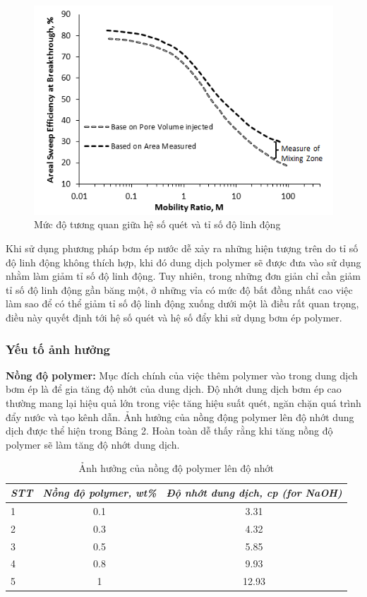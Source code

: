 \documentclass[12pt,a4paper]{article}
\begin{document}
		\begin{figure}[h]
			\centering
			\includegraphics[scale=1]{Fig/M.PNG}
			\caption{Mức độ tương quan giữa hệ số quét và tỉ số độ linh động \cite{kantzas2012fundamentals}}
		\end{figure}
	\newline
	Khi sử dụng phương pháp bơm ép nước dễ xảy ra những hiện tượng trên do tỉ số độ linh động không thích hợp, khi đó dung dịch polymer sẽ được đưa vào sử dụng nhằm làm giảm tỉ số độ linh động. Tuy nhiên, trong những đơn giản chỉ cần giảm tỉ số độ linh động gần băng một, ở những vỉa có mức độ bất đồng nhất cao việc làm sao để có thể giảm tỉ số độ linh động xuống dưới một là điều rất quan trọng, điều này quyết định tới hệ số quét và hệ số đẩy khi sử dụng bơm ép polymer. 

	\subsubsection{Yếu tố ảnh hưởng}
	\textbf{Nồng độ polymer:} Mục đích chính của việc thêm polymer vào trong dung dịch bơm ép là để gia tăng độ nhớt của dung dịch. Độ nhớt dung dịch bơm ép cao thường mang lại hiệu quả lớn trong việc tăng hiệu suất quét, ngăn chặn quá trình đẩy nước và tạo kênh dẫn. Ảnh hưởng của nồng động polymer lên độ nhớt dung dịch được thể hiện trong Bảng 2. Hoàn toàn dễ thấy rằng khi tăng nồng độ polymer sẽ làm tăng độ nhớt dung dịch.
	
	\begin{table}[h]
	\centering
	\caption{Ảnh hưởng của nồng độ polymer lên độ nhớt \cite{nguyen2015effective}}
	\label{my-label}
	\begin{tabular}{@{}lcc@{}}
	\toprule
	\textit{STT} & \multicolumn{1}{l}{\textit{Nồng độ polymer, wt\%}} & \multicolumn{1}{l}{\textit{Độ nhớt dung dịch, cp (for NaOH)}} \\ \midrule
	1 & 0.1 & 3.31 \\
	2 & 0.3 & 4.32 \\
	3 & 0.5 & 5.85 \\
	4 & 0.8 & 9.93 \\
	5 & 1 & 12.93 \\ \bottomrule
	\end{tabular}
	\end{table}
\end{document}
